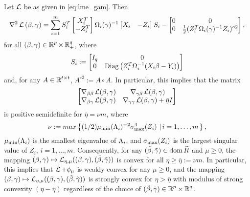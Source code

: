 \begin{lemma}\label{lem:LL weak cvx}
Let $\operatorname{\mathcal{L}}$ be as given in \eqref{eq:lme_gam}. Then
\begin{equation}\label{eq:hess LL}
\nabla^2\operatorname{\mathcal{L}}{(\beta,\gamma)}=\sum_{i=1}^m
S_i^T\begin{bmatrix}X_i^T\\ -Z_i^T\end{bmatrix}
\Omega_i(\gamma)^{-1}
\begin{bmatrix}X_i& -Z_i\end{bmatrix}S_i
-\begin{bmatrix}
0&0\\ 0& \frac{1}{2}(Z_i^T\Omega_i(\gamma)^{-1}Z_i)^{\circ2}
\end{bmatrix},
\end{equation}
for all
$(\beta,\gamma)\in\operatorname{\mathbb{R}}^p\times\operatorname{\mathbb{R}}^q_+$, where 
\[
S_i:=\begin{bmatrix}
I_q&0\\ 0&\mathrm{Diag}\left(Z_i^T\Omega_i^{-1}(X_i\beta-Y_i)\right)
\end{bmatrix}
\]
and, for any $A\in\operatorname{\mathbb{R}}^{t\times t}$, $A^{\circ 2}:=A\circ A$. In particular, this implies
that the matrix
\begin{equation}\label{eq:psd for LL}
\begin{bmatrix}
\nabla_{\beta\beta}\operatorname{\mathcal{L}}(\beta,\gamma)&\nabla_{\gamma\beta}\operatorname{\mathcal{L}}(\beta,\gamma)\\
\nabla_{\beta\gamma}\operatorname{\mathcal{L}}(\beta,\gamma)&\nabla_{\gamma\gamma}\operatorname{\mathcal{L}}(\beta,\gamma)
+{\bar\eta} I\end{bmatrix}
\end{equation}
is positive semidefinite
for $\bar\eta= \nu m$, where
\[
\nu:=max\left\{(1/2) \mu_{\text{min}}(\Lambda_i)^{-2}\sigma^4_{\text{max}}(Z_i)\,\left|\,i=1,\dots,m\right.\right\},
\]
$\mu_{\text{min}}(\Lambda_i)$ is the smallest eigenvalue of $\Lambda_i$, and
 $\sigma_{\text{max}}(Z_i)$ is the largest singular value of $Z_i,\, i=1,\dots,m$.
Consequently, for any $(\tilde\beta,{\tilde{\gamma}})\in\operatorname{\mathrm{dom}}{{\widetilde R}}$ and $\mu\ge 0$, the mapping 
\(
(\beta,\gamma)\mapsto \operatorname{\mathcal{L}}_{{\eta,\mu}}((\beta,\gamma), (\tilde\beta,{\tilde{\gamma}}))
\)
is convex for all $\eta\ge\bar\eta:=\nu m$.
In particular, this implies that $\operatorname{\mathcal{L}}+\phi_\mu$ is weakly convex for any $\mu\ge 0$, 
and the mapping
\(
(\beta,\gamma)\mapsto\operatorname{\mathcal{L}}_{{\eta,\mu}}((\beta,\gamma),(\tilde\beta,{\tilde{\gamma}}))
\)
is strongly convex for $\eta> \bar\eta$ with modulus of strong convexity $(\eta-\bar\eta)$
regardless of the choice of $(\tilde\beta,{\tilde{\gamma}})\in{\operatorname{\mathbb{R}}^p}\times{\operatorname{\mathbb{R}}^q}$.
\end{lemma}
